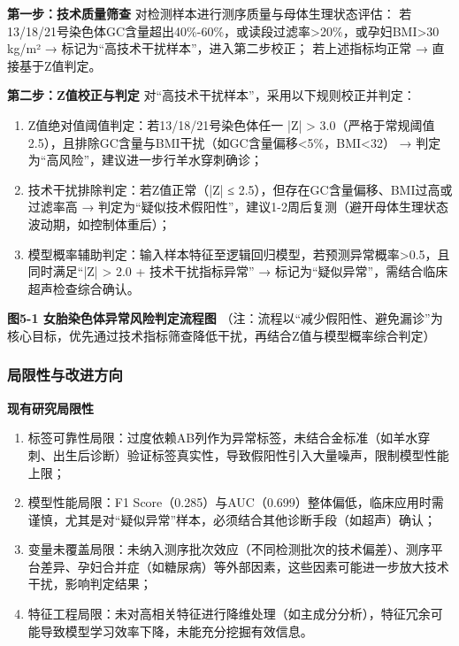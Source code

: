 \documentclass[withoutpreface,bwprint]{cumcmthesis} %
\begin{document}
\textbf{第一步：技术质量筛查}
对检测样本进行测序质量与母体生理状态评估：  
若13/18/21号染色体GC含量超出40\%-60\%，或读段过滤率>20\%，或孕妇BMI>30 kg/m² → 标记为“高技术干扰样本”，进入第二步校正；  
若上述指标均正常 → 直接基于Z值判定。

\textbf{第二步：Z值校正与判定}
对“高技术干扰样本”，采用以下规则校正并判定：
\begin{enumerate}
    \item Z值绝对值阈值判定：若13/18/21号染色体任一 |Z| > 3.0（严格于常规阈值2.5），且排除GC含量与BMI干扰（如GC含量偏移<5\%，BMI<32） → 判定为“高风险”，建议进一步行羊水穿刺确诊；
    \item 技术干扰排除判定：若Z值正常（|Z| ≤ 2.5），但存在GC含量偏移、BMI过高或过滤率高 → 判定为“疑似技术假阳性”，建议1-2周后复测（避开母体生理状态波动期，如控制体重后）；
    \item 模型概率辅助判定：输入样本特征至逻辑回归模型，若预测异常概率>0.5，且同时满足“|Z| > 2.0 + 技术干扰指标异常” → 标记为“疑似异常”，需结合临床超声检查综合确认。
\end{enumerate}

\textbf{图5-1 女胎染色体异常风险判定流程图}
（注：流程以“减少假阳性、避免漏诊”为核心目标，优先通过技术指标筛查降低干扰，再结合Z值与模型概率综合判定）


\subsubsection{局限性与改进方向}
\textbf{现有研究局限性}
\begin{enumerate}
    \item 标签可靠性局限：过度依赖AB列作为异常标签，未结合金标准（如羊水穿刺、出生后诊断）验证标签真实性，导致假阳性引入大量噪声，限制模型性能上限；
    \item 模型性能局限：F1 Score（0.285）与AUC（0.699）整体偏低，临床应用时需谨慎，尤其是对“疑似异常”样本，必须结合其他诊断手段（如超声）确认；
    \item 变量未覆盖局限：未纳入测序批次效应（不同检测批次的技术偏差）、测序平台差异、孕妇合并症（如糖尿病）等外部因素，这些因素可能进一步放大技术干扰，影响判定结果；
    \item 特征工程局限：未对高相关特征进行降维处理（如主成分分析），特征冗余可能导致模型学习效率下降，未能充分挖掘有效信息。
\end{enumerate}
\end{document}
